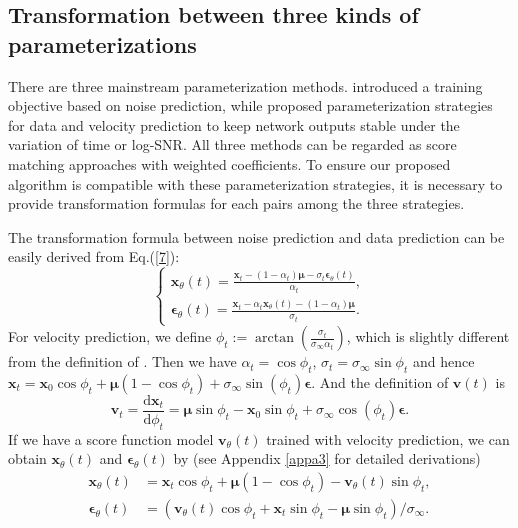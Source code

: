 \subsection{Transformation between three kinds of parameterizations}

There are three mainstream parameterization methods. \cite{ho2020ddpm} introduced a training objective based on noise prediction, while \cite{salimans2022progressive} proposed parameterization strategies for data and velocity prediction to keep network outputs stable under the variation of time or log-SNR. All three methods can be regarded as score matching approaches \citep{song2020sde,hyvarinen2005scorematch} with weighted coefficients. To ensure our proposed algorithm is compatible with these parameterization strategies, it is necessary to provide transformation formulas for each pairs among the three strategies.

The transformation formula between noise prediction and data prediction can be easily derived from Eq.(\ref{7}):
\begin{equation}
\begin{cases}
\boldsymbol{x}_\theta(t)=\frac{\boldsymbol{x}_t-(1-\alpha_t)\boldsymbol{\mu}-\sigma_t\boldsymbol{\epsilon}_\theta(t)}{\alpha_t},\\
\boldsymbol{\epsilon}_\theta(t)=\frac{\boldsymbol{x}_t-\alpha_t\boldsymbol{x}_\theta(t)-(1-\alpha_t)\boldsymbol{\mu}}{\sigma_t}.
\label{30}
\end{cases}
\end{equation}
For velocity prediction, we define $\phi_t:=\arctan(\frac{\sigma_t}{\sigma_\infty\alpha_t})$, which is slightly different from the definition of \cite{salimans2022progressive}. Then we have $\alpha_t=\cos{\phi_t}$, $\sigma_t=\sigma_\infty\sin{\phi_t}$ and hence $\boldsymbol{x}_t=\boldsymbol{x}_0\cos{\phi_t}+\boldsymbol{\mu}(1-\cos{\phi_t})+\sigma_\infty\sin{(\phi_t)}\boldsymbol{\epsilon}$. And the definition of $\boldsymbol{v}(t)$ is
\begin{equation}
\boldsymbol{v}_t=\frac{\mathrm{d}\boldsymbol{x}_t}{\mathrm{d}\phi_t}
=\boldsymbol{\mu}\sin\phi_t-\boldsymbol{x}_0\sin\phi_t+\sigma_\infty\cos(\phi_t)\boldsymbol\epsilon.
\label{31}
\end{equation}
If we have a score function model $\boldsymbol{v}_\theta(t)$ trained with velocity prediction, we can obtain $\boldsymbol{x}_\theta(t)$ and $\boldsymbol{\epsilon}_\theta(t)$ by (see Appendix \ref{appa3} for detailed derivations)
\begin{align}
\boldsymbol{x}_\theta(t)&=\boldsymbol{x}_t\cos\phi_t+\boldsymbol{\mu}(1-\cos\phi_t)-\boldsymbol{v}_\theta(t)\sin\phi_t, \label{32}\\
\boldsymbol\epsilon_\theta(t)&=(\boldsymbol{v}_\theta(t)\cos\phi_t+\boldsymbol{x}_t\sin\phi_t-\boldsymbol\mu\sin\phi_t)/\sigma_\infty. \label{33}
\end{align}